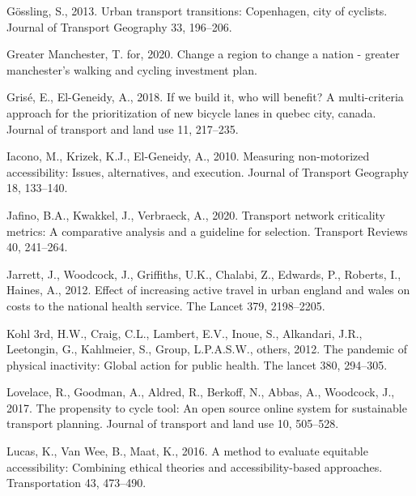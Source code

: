 \documentclass[
]{article}
\newlength{\cslhangindent}
\newlength{\cslentryspacingunit} %
\newenvironment{CSLReferences}[2] %
 {%
  \setlength{\parindent}{0pt}
  \ifodd #1
  \let\oldpar\par
  \def\par{\hangindent=\cslhangindent\oldpar}
  \fi
  \setlength{\parskip}{#2\cslentryspacingunit}
 }%
 {}
\begin{document}
\begin{CSLReferences}{1}{0}
\leavevmode{}%
Gössling, S., 2013. Urban transport transitions: Copenhagen, city of cyclists. Journal of Transport Geography 33, 196--206.

\leavevmode{}%
Greater Manchester, T. for, 2020. Change a region to change a nation - greater manchester's walking and cycling investment plan.

\leavevmode{}%
Grisé, E., El-Geneidy, A., 2018. If we build it, who will benefit? A multi-criteria approach for the prioritization of new bicycle lanes in quebec city, canada. Journal of transport and land use 11, 217--235.

\leavevmode{}%
Iacono, M., Krizek, K.J., El-Geneidy, A., 2010. Measuring non-motorized accessibility: Issues, alternatives, and execution. Journal of Transport Geography 18, 133--140.

\leavevmode{}%
Jafino, B.A., Kwakkel, J., Verbraeck, A., 2020. Transport network criticality metrics: A comparative analysis and a guideline for selection. Transport Reviews 40, 241--264.

\leavevmode{}%
Jarrett, J., Woodcock, J., Griffiths, U.K., Chalabi, Z., Edwards, P., Roberts, I., Haines, A., 2012. Effect of increasing active travel in urban england and wales on costs to the national health service. The Lancet 379, 2198--2205.

\leavevmode{}%
Kohl 3rd, H.W., Craig, C.L., Lambert, E.V., Inoue, S., Alkandari, J.R., Leetongin, G., Kahlmeier, S., Group, L.P.A.S.W., others, 2012. The pandemic of physical inactivity: Global action for public health. The lancet 380, 294--305.

\leavevmode{}%
Lovelace, R., Goodman, A., Aldred, R., Berkoff, N., Abbas, A., Woodcock, J., 2017. The propensity to cycle tool: An open source online system for sustainable transport planning. Journal of transport and land use 10, 505--528.

\leavevmode{}%
Lucas, K., Van Wee, B., Maat, K., 2016. A method to evaluate equitable accessibility: Combining ethical theories and accessibility-based approaches. Transportation 43, 473--490.


\end{CSLReferences}
\end{document}
